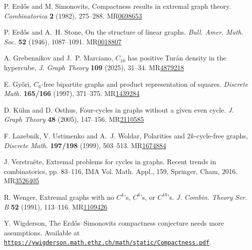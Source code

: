 \documentclass[A4paper,reqno,oneside,11pt]{amsart}
\theoremstyle{plain}
\theoremstyle{definition}
\begin{document}
\begin{thebibliography}{}
P. Erd\H{o}s and M. Simonovits, 
Compactness results in extremal graph theory.
{\it Combinatorica} {\bf 2} (1982), 275--288.
MR\href{https://mathscinet.ams.org/mathscinet/article?mr=698653}{0698653}

P. Erd\H{o}s and A.~H. Stone, On the structure of linear graphs.
{\it Bull. Amer. Math. Soc.} {\bf 52} (1946), 1087--1091.
MR\href{https://mathscinet.ams.org/mathscinet/article?mr=0018807}{0018807}

A. Grebennikov and J.~P. Marciano, 
$C_{10}$ has positive Tur\'an density in the hypercube,
{\it J. Graph Theory} {\bf 109} (2025), 31--34.
MR\href{https://mathscinet.ams.org/mathscinet/article?mr=4879218}{4879218}


E. Gy\H{o}ri, 
$C_6$-free bipartite graphs and product representation of squares. 
{\it Discrete Math.} {\bf 165/166} (1997), 371--375. 
MR\href{https://mathscinet.ams.org/mathscinet/article?mr=1439284}{1439284}


D. K\"uhn and D. Osthus, Four-cycles in graphs without a given even cycle.
{\it J. Graph Theory} {\bf 48} (2005), 147--156.
MR\href{https://mathscinet.ams.org/mathscinet/article?mr=2110585}{2110585}

F. Lazebnik, V. Ustimenko and A.~J. Woldar, 
Polarities and $2k$-cycle-free graphs, 
{\it Discrete Math.} {\bf 197/198} (1999), 503--513.
MR\href{https://mathscinet.ams.org/mathscinet/article?mr=1674884}{1674884}

J. Verstra\"ete, 
Extremal problems for cycles in graphs. Recent trends in combinatorics, pp. 83--116, IMA Vol. Math. Appl., 159, Springer, Cham, 2016.
MR\href{https://mathscinet.ams.org/mathscinet/article?mr=3526405}{3526405}

R. Wenger, Extremal graphs with no $C^4$'s, $C^6$'s, or $C^{10}$'s.
{\it J. Combin. Theory Ser. B} {\bf 52} (1991), 113--116.
MR\href{https://mathscinet.ams.org/mathscinet/article?mr=1109426}{1109426}

Y. Wigderson, The Erd\H{o}s--Simonovits compactness conjecture needs more assumptions.
Available at \href{https://ywigderson.math.ethz.ch/math/static/Compactness.pdf}{{\tt https://ywigderson.math.ethz.ch/math/static/Compactness.pdf}}.

\end{thebibliography}
\end{document}
